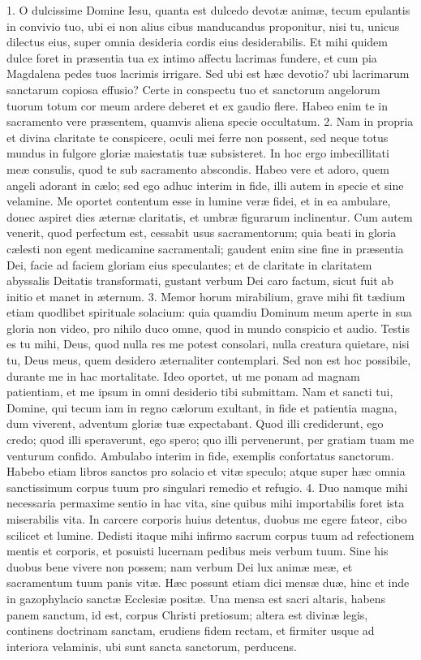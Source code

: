 \documentclass[twoside]{article}
\begin{document}
1. O dulcissime Domine Iesu, quanta est dulcedo devotæ animæ, tecum epulantis in convivio tuo, ubi ei non alius cibus manducandus proponitur, nisi tu, unicus dilectus eius, super omnia desideria cordis eius desiderabilis. Et mihi quidem dulce foret in præsentia tua ex intimo affectu lacrimas fundere, et cum pia Magdalena pedes tuos lacrimis irrigare. Sed ubi est hæc devotio? ubi lacrimarum sanctarum copiosa effusio? Certe in conspectu tuo et sanctorum angelorum tuorum totum cor meum ardere deberet et ex gaudio flere. Habeo enim te in sacramento vere præsentem, quamvis aliena specie occultatum.
2. Nam in propria et divina claritate te conspicere, oculi mei ferre non possent, sed neque totus mundus in fulgore gloriæ maiestatis tuæ subsisteret. In hoc ergo imbecillitati meæ consulis, quod te sub sacramento abscondis. Habeo vere et adoro, quem angeli adorant in cælo; sed ego adhuc interim in fide, illi autem in specie et sine velamine. Me oportet contentum esse in lumine veræ fidei, et in ea ambulare, donec aspiret dies æternæ claritatis, et umbræ figurarum inclinentur. Cum autem venerit, quod perfectum est, cessabit usus sacramentorum; quia beati in gloria cælesti non egent medicamine sacramentali; gaudent enim sine fine in præsentia Dei, facie ad faciem gloriam eius speculantes; et de claritate in claritatem abyssalis Deitatis transformati, gustant verbum Dei caro factum, sicut fuit ab initio et manet in æternum.
3. Memor horum mirabilium, grave mihi fit tædium etiam quodlibet spirituale solacium: quia quamdiu Dominum meum aperte in sua gloria non video, pro nihilo duco omne, quod in mundo conspicio et audio. Testis es tu mihi, Deus, quod nulla res me potest consolari, nulla creatura quietare, nisi tu, Deus meus, quem desidero æternaliter contemplari. Sed non est hoc possibile, durante me in hac mortalitate. Ideo oportet, ut me ponam ad magnam patientiam, et me ipsum in omni desiderio tibi submittam. Nam et sancti tui, Domine, qui tecum iam in regno cælorum exultant, in fide et patientia magna, dum viverent, adventum gloriæ tuæ expectabant. Quod illi crediderunt, ego credo; quod illi speraverunt, ego spero; quo illi pervenerunt, per gratiam tuam me venturum confido. Ambulabo interim in fide, exemplis confortatus sanctorum. Habebo etiam libros sanctos pro solacio et vitæ speculo; atque super hæc omnia sanctissimum corpus tuum pro singulari remedio et refugio.
4. Duo namque mihi necessaria permaxime sentio in hac vita, sine quibus mihi importabilis foret ista miserabilis vita. In carcere corporis huius detentus, duobus me egere fateor, cibo scilicet et lumine. Dedisti itaque mihi infirmo sacrum corpus tuum ad refectionem mentis et corporis, et posuisti lucernam pedibus meis verbum tuum. Sine his duobus bene vivere non possem; nam verbum Dei lux animæ meæ, et sacramentum tuum panis vitæ. Hæc possunt etiam dici mensæ duæ, hinc et inde in gazophylacio sanctæ Ecclesiæ positæ. Una mensa est sacri altaris, habens panem sanctum, id est, corpus Christi pretiosum; altera est divinæ legis, continens doctrinam sanctam, erudiens fidem rectam, et firmiter usque ad interiora velaminis, ubi sunt sancta sanctorum, perducens.
\end{document}
